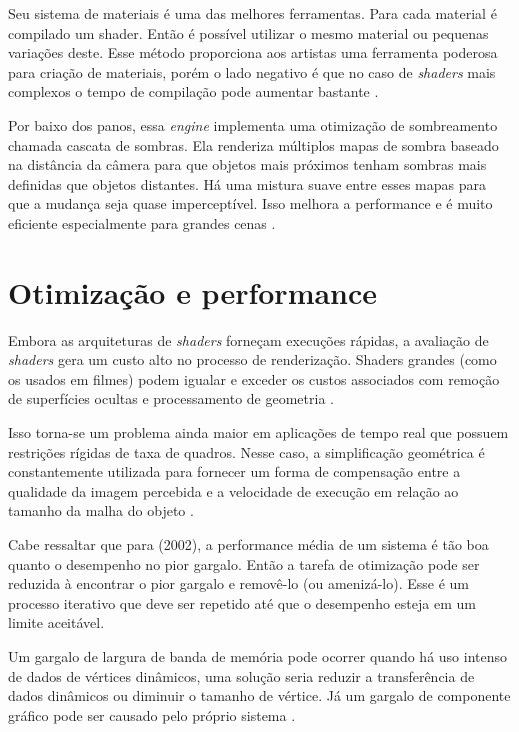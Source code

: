 Seu sistema de materiais é uma das melhores ferramentas. Para cada material é compilado um shader. Então é possível utilizar o mesmo material ou pequenas variações deste. Esse método proporciona aos artistas uma ferramenta poderosa para criação de materiais, porém o lado negativo é que no caso de \textit{shaders} mais complexos o tempo de compilação pode aumentar bastante \cite{vsmid2017comparison}.

Por baixo dos panos, essa \textit{engine} implementa uma otimização de sombreamento chamada cascata de sombras. Ela renderiza múltiplos mapas de sombra baseado na distância da câmera para que objetos mais próximos tenham sombras mais definidas que objetos distantes. Há uma mistura suave entre esses mapas para que a mudança seja quase imperceptível. Isso melhora a performance e é muito eficiente especialmente para grandes cenas \cite{vsmid2017comparison}. 

\section{Otimização e performance}
\label{sec:otimizacao-performance}

Embora as arquiteturas de \textit{shaders} forneçam execuções rápidas, a avaliação de \textit{shaders} gera um custo alto no processo de renderização. Shaders grandes (como os usados em filmes) podem igualar e exceder os custos associados com remoção de superfícies ocultas e processamento de geometria \cite{fabio2005user}. 

Isso torna-se um problema ainda maior em aplicações de tempo real que possuem restrições rígidas de taxa de quadros. Nesse caso, a simplificação geométrica é constantemente utilizada para fornecer um forma de compensação entre a qualidade da imagem percebida e a velocidade de execução em relação ao tamanho da malha do objeto \cite{fabio2005user}.

Cabe ressaltar que para  (2002), a performance média de um sistema é tão boa quanto o desempenho no pior gargalo. Então a tarefa de otimização pode ser reduzida à encontrar o pior gargalo e removê-lo (ou amenizá-lo). Esse é um processo iterativo que deve ser repetido até que o desempenho esteja em um limite aceitável.

Um gargalo de largura de banda de memória pode ocorrer quando há uso intenso de dados de vértices dinâmicos, uma solução seria reduzir a transferência de dados dinâmicos ou diminuir o tamanho de vértice. Já um gargalo de componente gráfico pode ser causado pelo próprio sistema \cite{riguer2002performance}.

